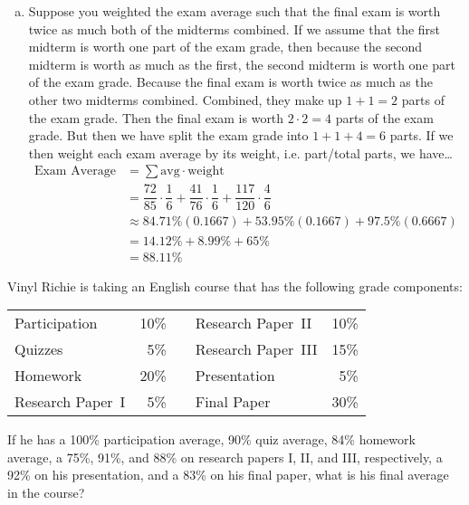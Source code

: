 \documentclass[11pt,letterpaper]{article}
\begin{document}
\begin{enumerate}[(a)]
\item Suppose you weighted the exam average such that the final exam is worth twice as much both of the midterms combined. If we assume that the first midterm is worth one part of the exam grade, then because the second midterm is worth as much as the first, the second midterm is worth one part of the exam grade. Because the final exam is worth twice as much as the other two midterms combined. Combined, they make up $1 + 1= 2$ parts of the exam grade. Then the final exam is worth $2 \cdot 2= 4$ parts of the exam grade. But then we have split the exam grade into $1 + 1 + 4= 6$ parts. If we then weight each exam average by its weight, i.e. part/total parts, we have\dots
	\[
	\begin{aligned}
	\text{Exam Average}&= \sum \text{avg} \cdot \text{weight} \\
	&= \dfrac{72}{85} \cdot \dfrac{1}{6} + \dfrac{41}{76} \cdot \dfrac{1}{6} + \dfrac{117}{120} \cdot \dfrac{4}{6} \\
	&\approx 84.71\% (0.1667) + 53.95\% (0.1667) + 97.5\% (0.6667) \\
	&= 14.12\% + 8.99\% + 65\% \\
	&= 88.11\%
	\end{aligned}
	\] 
\end{enumerate}



\newpage



 Vinyl Richie is taking an English course that has the following grade components: \par
	\begin{table}[!ht]
	\centering
	\begin{tabular}{lrclr}
	Participation & 10\% && Research Paper~II & 10\% \\
	Quizzes & 5\% && Research Paper~III & 15\% \\
	Homework & 20\% && Presentation & 5\% \\
	Research Paper~I & 5\% && Final Paper & 30\%
	\end{tabular}
	\end{table} \par
If he has a 100\% participation average, 90\% quiz average, 84\% homework average, a 75\%, 91\%, and 88\% on research papers I, II, and III, respectively, a 92\% on his presentation, and a 83\% on his final paper, what is his final average in the course? \pspace
\end{document}
